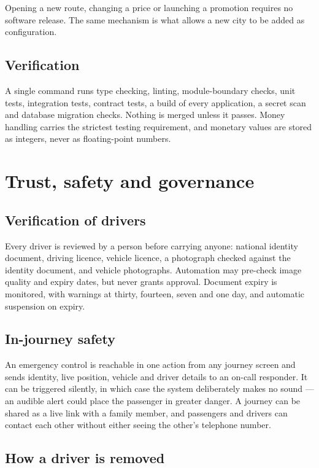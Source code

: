 Opening a new route, changing a price or launching a promotion requires no software release. The
same mechanism is what allows a new city to be added as configuration.

\section{Verification}

A single command runs type checking, linting, module-boundary checks, unit tests, integration tests,
contract tests, a build of every application, a secret scan and database migration checks. Nothing
is merged unless it passes. Money handling carries the strictest testing requirement, and monetary
values are stored as integers, never as floating-point numbers.

\chapter{Trust, safety and governance}

\section{Verification of drivers}

Every driver is reviewed by a person before carrying anyone: national identity document, driving
licence, vehicle licence, a photograph checked against the identity document, and vehicle
photographs. Automation may pre-check image quality and expiry dates, but never grants approval.
Document expiry is monitored, with warnings at thirty, fourteen, seven and one day, and automatic
suspension on expiry.

\section{In-journey safety}

An emergency control is reachable in one action from any journey screen and sends identity, live
position, vehicle and driver details to an on-call responder. It can be triggered silently, in which
case the system deliberately makes no sound --- an audible alert could place the passenger in
greater danger. A journey can be shared as a live link with a family member, and passengers and
drivers can contact each other without either seeing the other's telephone number.

\section{How a driver is removed}

